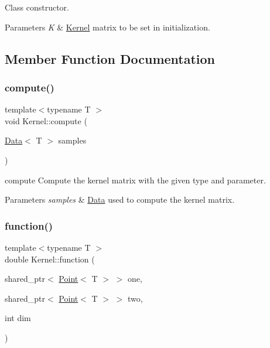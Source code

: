 Class constructor. 


\begin{DoxyParams}{Parameters}
{\em K} & \hyperlink{class_kernel}{Kernel} matrix to be set in initialization. \\
\hline
\end{DoxyParams}


\subsection{Member Function Documentation}
\mbox{\label{class_kernel_ab6d87a5acc63347bf7e1a40ac4abf03f}} 
\subsubsection{\texorpdfstring{compute()}{compute()}}
{\footnotesize\ttfamily template$<$typename T $>$ \\
void Kernel\+::compute (\begin{DoxyParamCaption}\item[{\hyperlink{class_data}{Data}$<$ T $>$}]{samples }\end{DoxyParamCaption})}



compute Compute the kernel matrix with the given type and parameter. 


\begin{DoxyParams}{Parameters}
{\em samples} & \hyperlink{class_data}{Data} used to compute the kernel matrix. \\
\hline
\end{DoxyParams}
\mbox{\label{class_kernel_a48ef2d6a0786b1a150f75af3f595c536}} 
\subsubsection{\texorpdfstring{function()}{function()}}
{\footnotesize\ttfamily template$<$typename T $>$ \\
double Kernel\+::function (\begin{DoxyParamCaption}\item[{shared\+\_\+ptr$<$ \hyperlink{class_point}{Point}$<$ T $>$ $>$}]{one,  }\item[{shared\+\_\+ptr$<$ \hyperlink{class_point}{Point}$<$ T $>$ $>$}]{two,  }\item[{int}]{dim }\end{DoxyParamCaption})}



